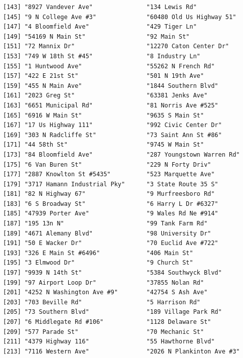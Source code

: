 \documentclass[
  12pt,
]{article}
\begin{document}
\begin{verbatim}
[143] "8927 Vandever Ave"               "134 Lewis Rd"                   
[145] "9 N College Ave #3"              "60480 Old Us Highway 51"        
[147] "4 Bloomfield Ave"                "429 Tiger Ln"                   
[149] "54169 N Main St"                 "92 Main St"                     
[151] "72 Mannix Dr"                    "12270 Caton Center Dr"          
[153] "749 W 18th St #45"               "8 Industry Ln"                  
[155] "1 Huntwood Ave"                  "55262 N French Rd"              
[157] "422 E 21st St"                   "501 N 19th Ave"                 
[159] "455 N Main Ave"                  "1844 Southern Blvd"             
[161] "2023 Greg St"                    "63381 Jenks Ave"                
[163] "6651 Municipal Rd"               "81 Norris Ave #525"             
[165] "6916 W Main St"                  "9635 S Main St"                 
[167] "17 Us Highway 111"               "992 Civic Center Dr"            
[169] "303 N Radcliffe St"              "73 Saint Ann St #86"            
[171] "44 58th St"                      "9745 W Main St"                 
[173] "84 Bloomfield Ave"               "287 Youngstown Warren Rd"       
[175] "6 Van Buren St"                  "229 N Forty Driv"               
[177] "2887 Knowlton St #5435"          "523 Marquette Ave"              
[179] "3717 Hamann Industrial Pky"      "3 State Route 35 S"             
[181] "82 N Highway 67"                 "9 Murfreesboro Rd"              
[183] "6 S Broadway St"                 "6 Harry L Dr #6327"             
[185] "47939 Porter Ave"                "9 Wales Rd Ne #914"             
[187] "195 13n N"                       "99 Tank Farm Rd"                
[189] "4671 Alemany Blvd"               "98 University Dr"               
[191] "50 E Wacker Dr"                  "70 Euclid Ave #722"             
[193] "326 E Main St #6496"             "406 Main St"                    
[195] "3 Elmwood Dr"                    "9 Church St"                    
[197] "9939 N 14th St"                  "5384 Southwyck Blvd"            
[199] "97 Airport Loop Dr"              "37855 Nolan Rd"                 
[201] "4252 N Washington Ave #9"        "42754 S Ash Ave"                
[203] "703 Beville Rd"                  "5 Harrison Rd"                  
[205] "73 Southern Blvd"                "189 Village Park Rd"            
[207] "6 Middlegate Rd #106"            "1128 Delaware St"               
[209] "577 Parade St"                   "70 Mechanic St"                 
[211] "4379 Highway 116"                "55 Hawthorne Blvd"              
[213] "7116 Western Ave"                "2026 N Plankinton Ave #3"       

\end{verbatim}
\end{document}
